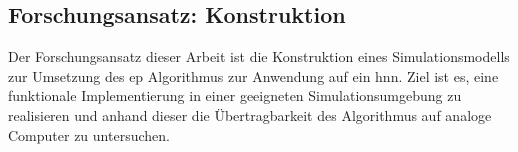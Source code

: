 \subsection{Forschungsansatz: Konstruktion}

Der Forschungsansatz dieser Arbeit ist die Konstruktion eines Simulationsmodells zur Umsetzung des \ac{ep} Algorithmus zur Anwendung auf ein \ac{hnn}. Ziel ist es, eine funktionale Implementierung in einer geeigneten Simulationsumgebung zu realisieren und anhand dieser die Übertragbarkeit des Algorithmus auf analoge Computer zu untersuchen.
